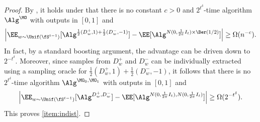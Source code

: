\begin{proof}
By \cite[Theorem 6.1]{tiegel2023hardness}, it holds under \cite[Assumption 3.4]{tiegel2023hardness} that there is no constant $c>0$ and $2^{t^\delta}$-time algorithm $\Alg^\MO$ with outputs in $[0,1]$ and
\[\left|\EE_{w \sim \Unif(\fS^{t-1})}[\Alg^{\frac{1}{2}(D_w^+, 1) + \frac{1}{2}(D_w^-, -1)}] - \EE[\Alg^{N(0, \frac{1}{2\pi}I_t)\times \Ber(1/2)}]\right| \geq \Omega(n^{-c}).\]
In fact, by a standard boosting argument, the advantage can be driven down to $2^{-t^\delta}$. Moreover, since samples from $D_w^+$ and $D_w^-$ can be individually extracted using a sampling oracle for $\frac{1}{2}(D_w^+,1)+\frac{1}{2}(D_w^-,-1)$, it follows that there is no $2^{t^\delta}$-time algorithm $\Alg^{\MO_0,\MO_1}$ with outputs in $[0,1]$ and
\[\left|\EE_{w \sim \Unif(\fS^{t-1})}[\Alg^{D_w^+,D_w^-}] - \EE[\Alg^{N(0, \frac{1}{2\pi}I_t),N(0, \frac{1}{2\pi}I_t)}]\right| \geq \Omega(2^{-t^\delta}).\]
This proves \cref{item:indist}.
\end{proof}

